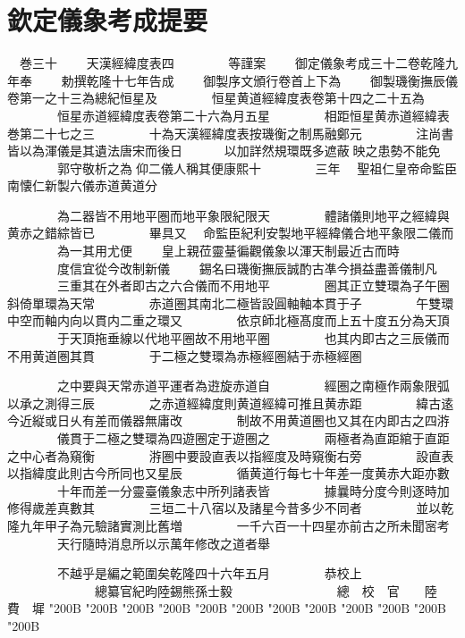 \chapter*{欽定儀象考成提要}
\begin{正文}
　巻三十
　　天漢經緯度表四
　　　　等謹案
　　御定儀象考成三十二卷乾隆九年奉
　　勅撰乾隆十七年告成
　　御製序文頒行卷首上下為
　　御製璣衡撫辰儀卷第一之十三為總紀恒星及
　　　　恒星黄道經緯度表卷第十四之二十五為
　　　　恒星赤道經緯度表卷第二十六為月五星
　　　　相距恒星黄赤道經緯表巻第二十七之三
　　　　十為天漢經緯度表按璣衡之制馬融鄭元
　　　　注尚書皆以為渾儀是其遺法唐宋而後日
　　　以加詳然規環既多遮蔽𨼆映之患勢不能免
　　　　郭守敬析之為𥳑仰二儀人稱其便康熙十
　　　　三年
　聖祖仁皇帝命監臣南懐仁新製六儀赤道黄道分
\par
　　　　為二器皆不用地平圏而地平象限紀限天
　　　　體諸儀則地平之經緯與黄赤之錯綜皆已
　　　　畢具又
　命監臣紀利安製地平經緯儀合地平象限二儀而
　　　　為一其用尤便
　　皇上親莅靈䑓徧觀儀象以渾天制最近古而時
　　　　度信宜從今改制新儀
　　錫名曰璣衡撫辰誠酌古凖今損益盡善儀制凡
　　　　三重其在外者即古之六合儀而不用地平
　　　　圏其正立雙環為子午圈斜倚單環為天常
　　　　赤道圏其南北二極皆設圓軸軸本貫于子
　　　　午雙環中空而軸内向以貫内二重之環又
　　　　依京師北極髙度而上五十度五分為天頂
　　　　于天頂拖垂線以代地平圈故不用地平圈
　　　　也其内即古之三辰儀而不用黄道圏其貫
　　　　于二極之雙環為赤極經圏結于赤極經圏
\par
　　　　之中要與天常赤道平運者為逰旋赤道自
　　　　經圏之南極作兩象限弧以承之測得三辰
　　　　之赤道經緯度則黄道經緯可推且黄赤距
　　　　緯古逺今近縦或日乆有差而儀器無庸改
　　　　制故不用黄道圏也又其在内即古之四㳺
　　　　儀貫于二極之雙環為四遊圈定于遊圏之
　　　　兩極者為直距綰于直距之中心者為窺衡
　　　　㳺圏中要設直表以指經度及時窺衡右旁
　　　　設直表以指緯度此則古今所同也又星辰
　　　　循黄道行每七十年差一度黄赤大距亦數
　　　　十年而差一分靈臺儀象志中所列諸表皆
　　　　據曩時分度今則逐時加修得歲差真數其
　　　　三垣二十八宿以及諸星今昔多少不同者
　　　　並以乾隆九年甲子為元驗諸實測比舊増
　　　　一千六百一十四星亦前古之所未聞宻考
　　　　天行隨時消息所以示萬年修改之道者舉
\par
　　　　不越乎是編之範圍矣乾隆四十六年五月
　　　　恭校上
　　　　　　　總纂官紀昀陸錫熊孫士毅
　　　　　　　　總　校　官　　陸　費　墀
\char"200B\relax{}
\char"200B\relax{}
\char"200B\relax{}
\char"200B\relax{}
\char"200B\relax{}
\char"200B\relax{}
\char"200B\relax{}
\char"200B\relax{}
\char"200B\relax{}
\char"200B\relax{}
\char"200B\relax{}
\char"200B\relax
\par

\par\end{正文}\clearpage
